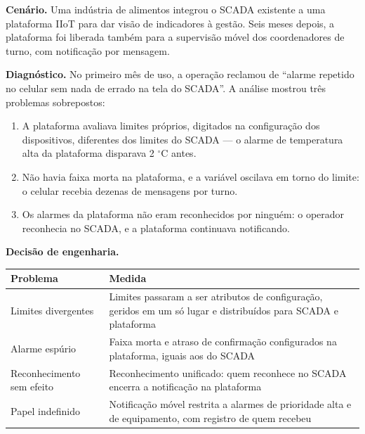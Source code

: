 \textbf{Cenário.} Uma indústria de alimentos integrou o SCADA existente a uma plataforma IIoT para dar
visão de indicadores à gestão. Seis meses depois, a plataforma foi liberada também para a supervisão
móvel dos coordenadores de turno, com notificação por mensagem.

\textbf{Diagnóstico.} No primeiro mês de uso, a operação reclamou de ``alarme repetido no celular sem nada
de errado na tela do SCADA''. A análise mostrou três problemas sobrepostos:

\begin{enumerate}
\def\labelenumi{\arabic{enumi}.}
\tightlist
\item
  A plataforma avaliava limites próprios, digitados na configuração dos dispositivos, diferentes dos
  limites do SCADA --- o alarme de temperatura alta da plataforma disparava 2 \ensuremath{^\circ}C antes.
\item
  Não havia faixa morta na plataforma, e a variável oscilava em torno do limite: o celular recebia
  dezenas de mensagens por turno.
\item
  Os alarmes da plataforma não eram reconhecidos por ninguém: o operador reconhecia no SCADA, e a
  plataforma continuava notificando.
\end{enumerate}

\textbf{Decisão de engenharia.}

\begin{longtable}[]{@{}
  >{\raggedright\arraybackslash}p{}
  >{\raggedright\arraybackslash}p{}@{}}
\toprule\noalign{}
\begin{minipage}[b]{\linewidth}\raggedright
Problema
\end{minipage} & \begin{minipage}[b]{\linewidth}\raggedright
Medida
\end{minipage} \\
\midrule\noalign{}
\endhead
\bottomrule\noalign{}
\endlastfoot
Limites divergentes & Limites passaram a ser atributos de configuração, geridos em um só lugar e distribuídos para SCADA e plataforma \\
Alarme espúrio & Faixa morta e atraso de confirmação configurados na plataforma, iguais aos do SCADA \\
Reconhecimento sem efeito & Reconhecimento unificado: quem reconhece no SCADA encerra a notificação na plataforma \\
Papel indefinido & Notificação móvel restrita a alarmes de prioridade alta e de equipamento, com registro de quem recebeu \\
\end{longtable}

